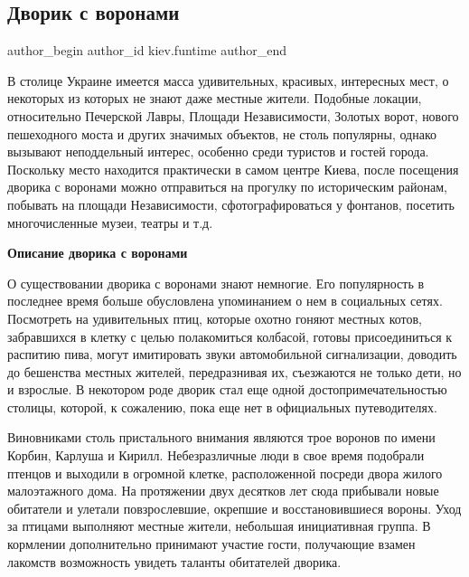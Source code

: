  
 
 
 
 
 
\subsection{Дворик с воронами}
\label{sec:10_05_2023.tg.kiev.funtime.1.dvorik_s_voronami}
 
\ifcmt
 author_begin
   author_id kiev.funtime
 author_end
\fi

В столице Украине имеется масса удивительных, красивых, интересных мест, о
некоторых из которых не знают даже местные жители. Подобные локации,
относительно Печерской Лавры, Площади Независимости, Золотых ворот, нового
пешеходного моста и других значимых объектов, не столь популярны, однако
вызывают неподдельный интерес, особенно среди туристов и гостей города.
Поскольку место находится практически в самом центре Киева, после посещения
дворика с воронами можно отправиться на прогулку по историческим районам,
побывать на площади Независимости, сфотографироваться у фонтанов, посетить
многочисленные музеи, театры и т.д.

\textbf{Описание дворика с воронами} 

О существовании дворика с воронами знают немногие. Его популярность в последнее
время больше обусловлена упоминанием о нем в социальных сетях. Посмотреть на
удивительных птиц, которые охотно гоняют местных котов, забравшихся в клетку с
целью полакомиться колбасой, готовы присоединиться к распитию пива, могут
имитировать звуки автомобильной сигнализации, доводить до бешенства местных
жителей, передразнивая их, съезжаются не только дети, но и взрослые. В
некотором роде дворик стал еще одной достопримечательностью столицы, которой, к
сожалению, пока еще нет в официальных путеводителях.

Виновниками столь пристального внимания являются трое воронов по имени Корбин,
Карлуша и Кирилл. Небезразличные люди в свое время подобрали птенцов и выходили
в огромной клетке, расположенной посреди двора жилого малоэтажного дома. На
протяжении двух десятков лет сюда прибывали новые обитатели и улетали
повзрослевшие, окрепшие и восстановившиеся вороны. Уход за птицами выполняют
местные жители, небольшая инициативная группа. В кормлении дополнительно
принимают участие гости, получающие взамен лакомств возможность увидеть таланты
обитателей дворика.


